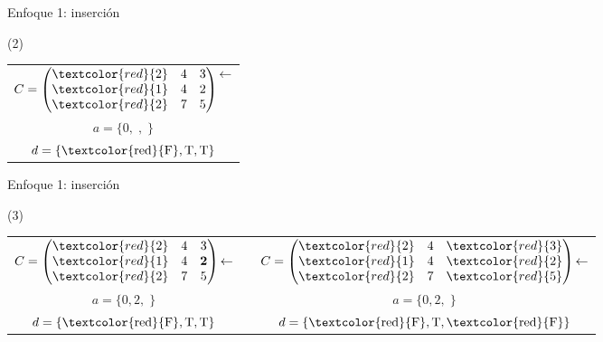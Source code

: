 \documentclass[10pt, xcolor=table]{beamer}
\begin{document}
\begin{frame}{Enfoque 1: inserción}
\begin{center}
	(2)
\end{center}
\begin{table}[h]
\centering
\begin{tabular}{c}
$C = \left(\begin{matrix}\textcolor{red}{2}&4&3\\\textcolor{red}{1}&4&2\\\textcolor{red}{2}&7&5\\\end{matrix}\right)\begin{matrix}\leftarrow\\\\\\\end{matrix}$\\
$a=\{0,\;,\;\}$\\
$d=\{\text{\textcolor{red}{F}},\text{T},\text{T}\}$\\
\end{tabular}
\end{table}
\end{frame}

\begin{frame}{Enfoque 1: inserción}
\begin{center}
	(3)
\end{center}
\begin{table}[h]
\centering
\begin{tabular}{ccc}
$C = \left(\begin{matrix}\textcolor{red}{2}&4&3\\\textcolor{red}{1}&4&\textbf{2}\\\textcolor{red}{2}&7&5\\\end{matrix}\right)\begin{matrix}\\\leftarrow\\\\\end{matrix}$&&$C = \left(\begin{matrix}\textcolor{red}{2}&4&\textcolor{red}{3}\\\textcolor{red}{1}&4&\textcolor{red}{2}\\\textcolor{red}{2}&7&\textcolor{red}{5}\\\end{matrix}\right)\begin{matrix}\\\leftarrow\\\\\end{matrix}$\\
$a=\{0,2,\;\}$ && $a=\{0,2,\;\}$\\
$d=\{\text{\textcolor{red}{F}},\text{T},\text{T}\}$&&$d=\{\text{\textcolor{red}{F}},\text{T},\text{\textcolor{red}{F}}\}$\\
\end{tabular}
\end{table}
\end{frame}
\end{document}
